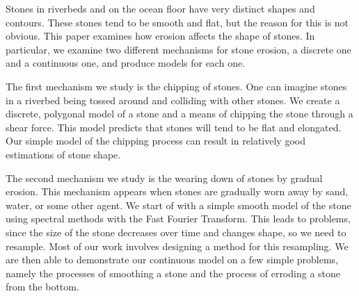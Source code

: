 Stones in riverbeds and on the ocean floor have very distinct shapes and contours. These stones tend to be smooth and flat, but the reason for this is not obvious. This paper examines how erosion affects the shape of stones. In particular, we examine two different mechanisms for stone erosion, a discrete one and a continuous one, and produce models for each one.

The first mechanism we study is the chipping of stones. One can imagine stones in a riverbed being tossed around and colliding with other stones. We create a discrete, polygonal model of a stone and a means of chipping the stone through a shear force. This model predicts that stones will tend to be flat and elongated. Our simple model of the chipping process can result in relatively good estimations of stone shape.

The second mechanism we study is the wearing down of stones by gradual erosion. This mechanism appears when stones are gradually worn away by sand, water, or some other agent. We start of with a simple smooth model of the stone using spectral methods with the Fast Fourier Transform. This leads to problems, since the size of the stone decreases over time and changes shape, so we need to resample. Most of our work involves designing a method for this resampling. We are then able to demonstrate our continuous model on a few simple problems, namely the processes of smoothing a stone and the process of erroding a stone from the bottom.
